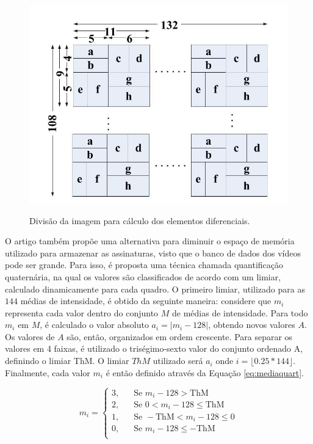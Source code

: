 \begin{figure}[h]
  \centering
    \caption{Divisão da imagem para cálculo dos elementos diferenciais.} 
    \includegraphics[width=\textwidth]{dados/figuras/sf_division.png}
    \label{fig:divsceneframe}
\end{figure}

O artigo também propõe uma alternativa para diminuir o espaço de memória utilizado para armazenar as assinaturas, visto que o banco de dados dos vídeos pode ser grande. Para isso, é proposta uma técnica chamada quantificação quaternária, na qual os valores são classificados de acordo com um limiar, calculado dinamicamente para cada quadro. O primeiro limiar, utilizado para as $144$ médias de intensidade, é obtido da seguinte maneira: considere que $m_i$ representa cada valor dentro do conjunto $M$ de médias de intensidade. Para todo $m_i$ em $M$, é calculado o valor absoluto $a_i = \lvert m_i - 128 \rvert$, obtendo novos valores $A$. Os valores de $A$ são, então, organizados em ordem crescente. Para separar os valores em 4 faixas, é utilizado o triségimo-sexto valor do conjunto ordenado A, definindo o limiar ThM. O limiar $ThM$ utilizado será $a_i$ onde $i = \lfloor 0.25*144 \rfloor$. Finalmente, cada valor $m_i$ é então definido através da Equação \ref{eq:mediaquart}.

\begin{equation}
	\label{eq:mediaquart}
	m_i = 
     \begin{cases}
       \text{3,} &\quad\text{Se } m_i-128 > \text{ThM} \\
       \text{2,} &\quad\text{Se } 0 < m_i - 128 \le \text{ThM} \\
       \text{1,} &\quad\text{Se } -\text{ThM} < m_i - 128 \le 0 \\
       \text{0,} &\quad\text{Se } m_i - 128 \le -\text{ThM} \\ 
     \end{cases}
\end{equation}


